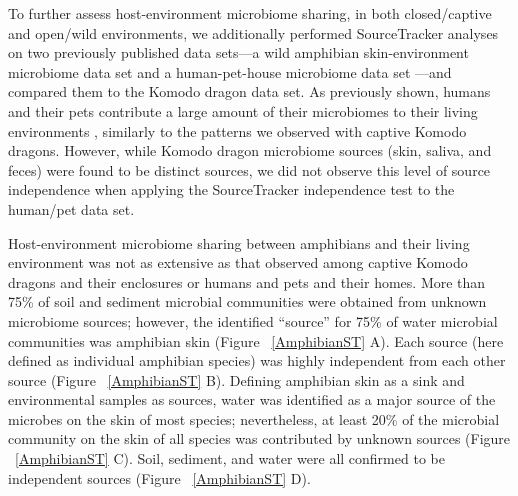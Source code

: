 To further assess host-environment microbiome sharing, in both closed/captive and
open/wild environments, we additionally performed SourceTracker analyses on two
previously published data sets—a wild amphibian skin-environment microbiome data set
\cite{Kueneman2014} and a human-pet-house microbiome data set \cite{Lax2014}—and
compared them to the Komodo dragon data set. As previously shown, humans and their
pets contribute a large amount of their microbiomes to their living environments
\cite{Lax2014}, similarly to the patterns we observed with captive Komodo dragons.
However, while Komodo dragon microbiome sources (skin, saliva, and feces) were
found to be distinct sources, we did not observe this level of source independence
when applying the SourceTracker independence test to the human/pet data set.

Host-environment microbiome sharing between amphibians and their living environment
was not as extensive as that observed among captive Komodo dragons and their
enclosures or humans and pets and their homes. More than 75\% of soil and sediment
microbial communities were obtained from unknown microbiome sources; however,
the identified “source” for 75\% of water microbial communities was amphibian skin
(Figure ~\ref{AmphibianST} A). Each source (here defined as individual amphibian
species) was highly independent from each other source (Figure ~\ref{AmphibianST} B).
Defining amphibian skin as a sink and environmental samples as sources, water was
identified as a major source of the microbes on the skin of most species; nevertheless,
at least 20\% of the microbial community on the skin of all species was contributed
by unknown sources (Figure ~\ref{AmphibianST} C). Soil, sediment, and water were
all confirmed to be independent sources (Figure ~\ref{AmphibianST} D).

